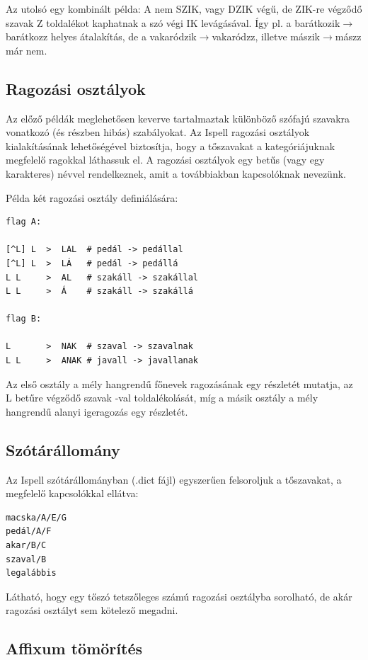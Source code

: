 Az utolsó egy kombinált példa: A nem SZIK, vagy DZIK végű,
de ZIK-re végződő szavak Z toldalékot kaphatnak
a szó végi IK levágásával. Így pl. a barátkozik$\rightarrow$barátkozz
helyes átalakítás, de a vakaródzik$\rightarrow$vakaródzz, illetve
mászik$\rightarrow$mászz már nem.

\subsection{Ragozási osztályok}

Az előző példák meglehetősen keverve tartalmaztak
különböző szófajú szavakra vonatkozó (és részben hibás)
szabályokat. Az Ispell ragozási osztályok kialakításának
lehetőségével biztosítja, hogy a tőszavakat a kategóriájuknak
megfelelő ragokkal láthassuk el. A ragozási osztályok
egy betűs (vagy egy karakteres) névvel rendelkeznek, amit
a továbbiakban kapcsolóknak nevezünk.

Példa két ragozási osztály definiálására:

\begin{verbatim}
flag A:

[^L] L  >  LAL  # pedál -> pedállal
[^L] L  >  LÁ   # pedál -> pedállá
L L     >  AL   # szakáll -> szakállal
L L     >  Á    # szakáll -> szakállá

flag B:

L       >  NAK  # szaval -> szavalnak
L L     >  ANAK # javall -> javallanak
\end{verbatim}

Az első osztály a mély hangrendű főnevek ragozásának
egy részletét mutatja, az L betűre végződő szavak -val
toldalékolását, míg a másik osztály a mély hangrendű
alanyi igeragozás egy részletét.

\subsection{Szótárállomány}

Az Ispell szótárállományban (.dict fájl)
egyszerűen felsoroljuk a tőszavakat, a megfelelő kapcsolókkal
ellátva:

\begin{verbatim}
macska/A/E/G
pedál/A/F
akar/B/C
szaval/B
legalábbis
\end{verbatim}

Látható, hogy egy tőszó tetszőleges számú
ragozási osztályba sorolható, de akár
ragozási osztályt sem kötelező megadni.

\subsection{Affixum tömörítés}

